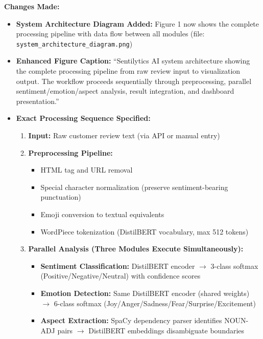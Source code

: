 \documentclass[11pt,a4paper]{article}
\begin{document}
\textbf{Changes Made:}
\begin{itemize}[leftmargin=*]
    \item \textbf{System Architecture Diagram Added:} Figure 1 now shows the complete processing pipeline with data flow between all modules (file: \texttt{system\_architecture\_diagram.png})
    
    \item \textbf{Enhanced Figure Caption:} ``Sentilytics AI system architecture showing the complete processing pipeline from raw review input to visualization output. The workflow proceeds sequentially through preprocessing, parallel sentiment/emotion/aspect analysis, result integration, and dashboard presentation.''
    
    \item \textbf{Exact Processing Sequence Specified:}
    \begin{enumerate}
        \item \textbf{Input:} Raw customer review text (via API or manual entry)
        
        \item \textbf{Preprocessing Pipeline:}
        \begin{itemize}
            \item HTML tag and URL removal
            \item Special character normalization (preserve sentiment-bearing punctuation)
            \item Emoji conversion to textual equivalents
            \item WordPiece tokenization (DistilBERT vocabulary, max 512 tokens)
        \end{itemize}
        
        \item \textbf{Parallel Analysis (Three Modules Execute Simultaneously):}
        \begin{itemize}
            \item \textbf{Sentiment Classification:} DistilBERT encoder $\rightarrow$ 3-class softmax (Positive/Negative/Neutral) with confidence scores
            \item \textbf{Emotion Detection:} Same DistilBERT encoder (shared weights) $\rightarrow$ 6-class softmax (Joy/Anger/Sadness/Fear/Surprise/Excitement)
            \item \textbf{Aspect Extraction:} SpaCy dependency parser identifies NOUN-ADJ pairs $\rightarrow$ DistilBERT embeddings disambiguate boundaries
        \end{itemize}
        

\end{enumerate}
\end{itemize}
\end{document}

